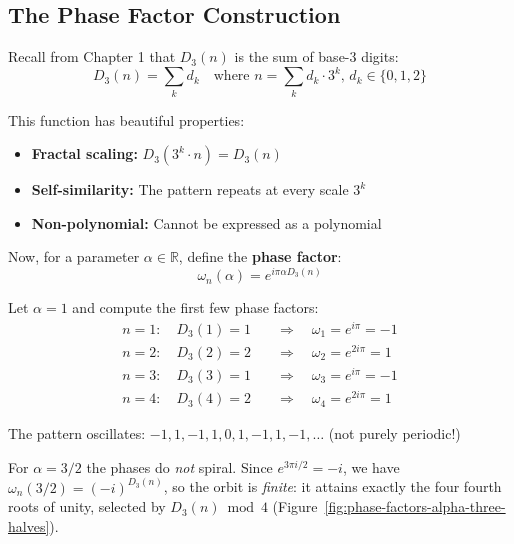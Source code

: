 \subsection{The Phase Factor Construction}

Recall from Chapter 1 that $D_3(n)$ is the sum of base-3 digits:
\begin{equation}
D_3(n) = \sum_{k} d_k \quad \text{where } n = \sum_{k} d_k \cdot 3^k, \, d_k \in \{0,1,2\}
\end{equation}

This function has beautiful properties:
\begin{itemize}
\item \textbf{Fractal scaling:} $D_3(3^k \cdot n) = D_3(n)$
\item \textbf{Self-similarity:} The pattern repeats at every scale $3^k$
\item \textbf{Non-polynomial:} Cannot be expressed as a polynomial
\end{itemize}

Now, for a parameter $\alpha \in \mathbb{R}$, define the \textbf{phase factor}:
\begin{equation}
\omega_n(\alpha) = e^{i\pi\alpha D_3(n)}
\end{equation}

\begin{example}
Let $\alpha = 1$ and compute the first few phase factors:
\begin{align}
n=1: \quad D_3(1) = 1 \quad &\Rightarrow \quad \omega_1 = e^{i\pi} = -1 \\
n=2: \quad D_3(2) = 2 \quad &\Rightarrow \quad \omega_2 = e^{2i\pi} = 1 \\
n=3: \quad D_3(3) = 1 \quad &\Rightarrow \quad \omega_3 = e^{i\pi} = -1 \\
n=4: \quad D_3(4) = 2 \quad &\Rightarrow \quad \omega_4 = e^{2i\pi} = 1
\end{align}

The pattern oscillates: $-1, 1, -1, 1, 0, 1, -1, 1, -1, \ldots$ (not purely periodic!)

For $\alpha = 3/2$ the phases do \emph{not} spiral. Since
$e^{3\pi i/2} = -i$, we have $\omega_n(3/2) = (-i)^{D_3(n)}$, so the orbit is
\emph{finite}: it attains exactly the four fourth roots of unity, selected by
$D_3(n) \bmod 4$ (Figure~\ref{fig:phase-factors-alpha-three-halves}).
\end{example}

